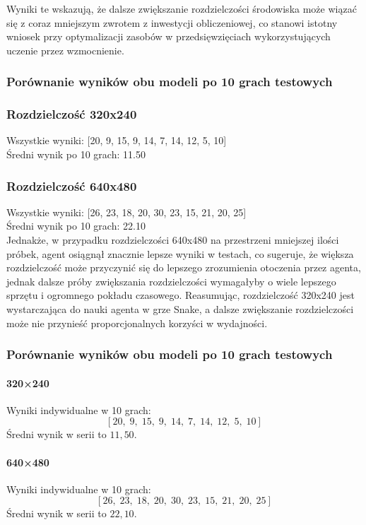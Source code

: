\documentclass[a4paper,12pt]{article}
\begin{document}
Wyniki te wskazują, że dalsze zwiększanie rozdzielczości środowiska może wiązać się z coraz mniejszym zwrotem z inwestycji obliczeniowej, co stanowi istotny wniosek przy optymalizacji zasobów w przedsięwzięciach wykorzystujących uczenie przez wzmocnienie.

\subsubsection{Porównanie wyników obu modeli po 10 grach testowych}
\subsubsection*{Rozdzielczość 320x240}
Wszystkie wyniki: [20, 9, 15, 9, 14, 7, 14, 12, 5, 10] \\
Średni wynik po 10 grach: 11.50

\subsubsection*{Rozdzielczość 640x480}
Wszystkie wyniki: [26, 23, 18, 20, 30, 23, 15, 21, 20, 25]\\
Średni wynik po 10 grach: 22.10 \\ 

Jednakże, w przypadku rozdzielczości 640x480 na przestrzeni mniejszej ilości próbek, agent osiągnął znacznie lepsze wyniki w testach, co sugeruje, że większa rozdzielczość może przyczynić się do lepszego zrozumienia otoczenia przez agenta, jednak dalsze próby zwiększania rozdzielczości wymagałyby o wiele lepszego sprzętu i ogromnego pokładu czasowego. Reasumując, rozdzielczość 320x240 jest wystarczająca do nauki agenta w grze Snake, a dalsze zwiększanie rozdzielczości może nie przynieść proporcjonalnych korzyści w wydajności.


\subsubsection{Porównanie wyników obu modeli po 10 grach testowych}

\paragraph{320×240}  
Wyniki indywidualne w 10 grach:  
\[
[20,\;9,\;15,\;9,\;14,\;7,\;14,\;12,\;5,\;10]
\]
Średni wynik w serii to \(11{,}50\).

\paragraph{640×480}  
Wyniki indywidualne w 10 grach:  
\[
[26,\;23,\;18,\;20,\;30,\;23,\;15,\;21,\;20,\;25]
\]
Średni wynik w serii to \(22{,}10\). \\
\end{document}
